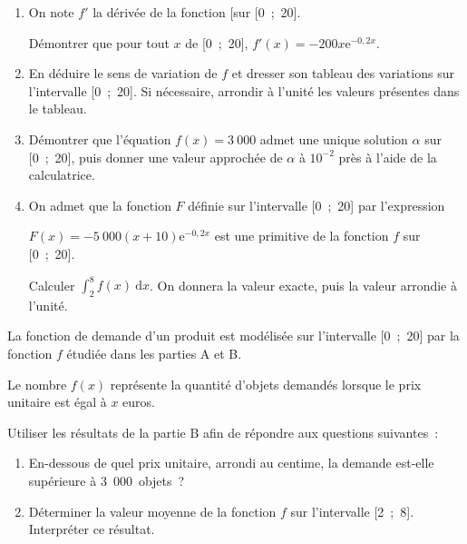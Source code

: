\begin{enumerate}
     \item On note $f'$ la dérivée de la fonction [sur [0~;~20].
     \par
     Démontrer que pour tout $x$ de [0~;~20], $f'(x) = - 200x\text{e}^{-0,2x}$.
     \item  En déduire le sens de variation de $f$ et dresser son tableau des variations sur
     l'intervalle [0~;~20]. Si nécessaire, arrondir à l'unité les valeurs présentes dans
     le tableau.
     \item  Démontrer que l'équation $f(x) = 3~000$ admet une unique solution $\alpha$ sur
     [0~;~20], puis donner une valeur approchée de $\alpha$ à $10^{-2}$ près à l'aide de la
     calculatrice.
     \item  On admet que la fonction $F$ définie sur l'intervalle [0~;~20] par l'expression
     \par
     $F(x) = - 5~000(x + 10)\text{e}^{-0,2x}$ est une primitive de la fonction $f$ sur [0~;~20].
     \par
     Calculer $\displaystyle\int_2^8 f(x)\:\text{d}x$. On donnera la valeur exacte, puis la valeur arrondie à
     l'unité.
\end{enumerate}
\bigskip
{}
\medskip
La fonction de demande d'un produit est modélisée sur l'intervalle [0~;~20] par la
fonction $f$ étudiée dans les parties A et B.
\par
Le nombre $f(x)$ représente la quantité d'objets demandés lorsque le prix unitaire est
égal à $x$ euros.
\par
Utiliser les résultats de la partie B afin de répondre aux questions suivantes~:
\bigskip
\begin{enumerate}
     \item En-dessous de quel prix unitaire, arrondi au centime, la demande est-elle
     supérieure à 3~000~objets~?
     \item Déterminer la valeur moyenne de la fonction $f$ sur l'intervalle
     [2~;~8]. Interpréter ce résultat.
\end{enumerate}

